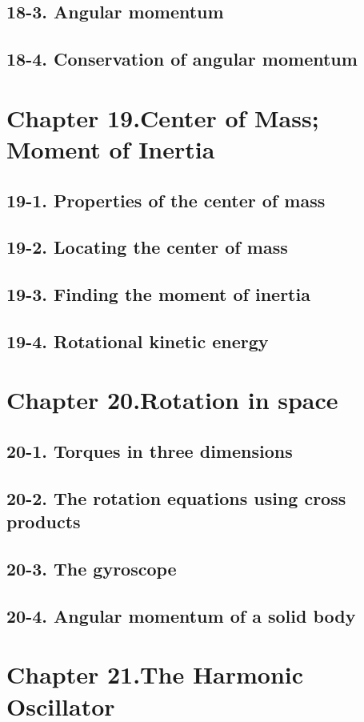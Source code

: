 \documentclass{article}
\begin{document}
\subsection{18-3. Angular momentum}
\subsection{18-4. Conservation of angular momentum}
\section{Chapter 19.Center of Mass; Moment of Inertia}
\subsection{19-1. Properties of the center of mass}
\subsection{19-2. Locating the center of mass}
\subsection{19-3. Finding the moment of inertia}
\subsection{19-4. Rotational kinetic energy}
\section{Chapter 20.Rotation in space}
\subsection{20-1. Torques in three dimensions}
\subsection{20-2. The rotation equations using cross products}
\subsection{20-3. The gyroscope}
\subsection{20-4. Angular momentum of a solid body}
\section{Chapter 21.The Harmonic Oscillator}
\end{document}

